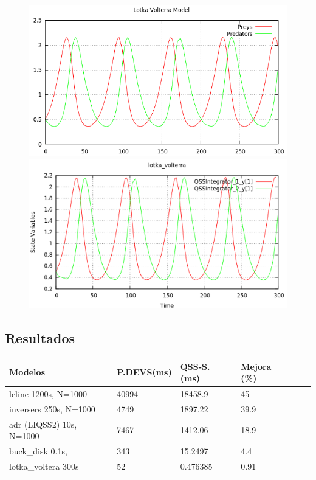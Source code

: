 \documentclass[a4paper,	11pt]{report}
\begin{document}
\begin{figure}[H]
\centering
\begin{minipage}{0.5\textwidth}
\centering
 \includegraphics[width=\linewidth]{lotka_voltera-pd}
\end{minipage}\hfill
\begin{minipage}{0.5\textwidth}
\centering
 \includegraphics[width=\linewidth]{lotka_voltera-qss}
\end{minipage}
\end{figure}

\subsection{Resultados}
\begin{table}[H]
\centering	
\label{my-label}
\begin{tabular}{llllll}
\toprule
{\bf Modelos}            &  {\bf P.DEVS(ms)} & {\bf QSS-S. (ms)} & {\bf Mejora (\%)} \\
\toprule
lcline 1200s, N=1000     & 40994         & 18458.9         & 45          \\
inversers 250s, N=1000   & 4749          & 1897.22         & 39.9        \\
adr (LIQSS2) 10s, N=1000 & 7467          & 1412.06         & 18.9        \\
buck\_disk  0.1s,        & 343           & 15.2497         & 4.4         \\
lotka\_voltera 300s      & 52            & 0.476385        & 0.91
\end{tabular}
\end{table}
\end{document}
